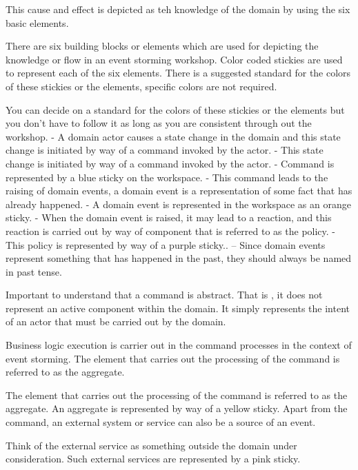 \documentclass[a4paper, 11pt]{book}
\begin{document}
    This cause and effect is depicted as teh knowledge of the domain by using the six basic elements.

    There are six building blocks or elements which are used for depicting the knowledge or flow in an event storming workshop.
    Color coded stickies are used to represent each of the six elements.
    There is a suggested standard for the colors of these stickies or the elements, specific colors are not required.

    You can decide on a standard for the colors of these stickies or the elements but you don't have to follow it as long as you are consistent through out the workshop.
    - A domain actor causes a state change in the domain and this state change is initiated by way of a command invoked by the actor.
    - This state change is initiated by way of a command invoked by the actor.
    - Command is represented by a blue sticky on the workspace.
    - This command leads to the raising of domain events, a domain event is a representation of some fact that has already happened.
    - A domain event is represented in the workspace as an orange sticky.
    - When the domain event is raised, it may lead to a reaction, and this reaction is carried out by way of component that is referred to as the policy.
    - This policy is represented by way of a purple sticky..
    -- Since domain events represent something that has happened in the past, they should always be named in past tense.

    Important to understand that a command is abstract.
    That is , it does not represent an active component within the domain.
    It simply represents the intent of an actor that must be carried out by the domain.

    Business logic execution is carrier out in the command processes in the context of event storming.
    The element that carries out the processing of the command is referred to as the aggregate.

    The element that carries out the processing of the command is referred to as the aggregate.
    An aggregate is represented by way of a yellow sticky.
    Apart from the command, an external system or service can also be a source of an event.

    Think of the external service as something outside the domain under consideration.
    Such external services are represented by a pink sticky.
\end{document}
